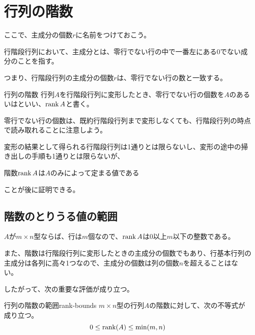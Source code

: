 \documentclass[../../../topic_linear-algebra]{subfiles}
\begin{document}
\sectionline
\section{行列の階数}

ここで、主成分の個数$r$に名前をつけておこう。

\br

行階段行列において、主成分とは、零行でない行の中で一番左にある0でない成分のことを指す。

つまり、行階段行列の主成分の個数$r$は、零行でない行の数と一致する。

\begin{definition*}{行列の階数}
  行列$A$を行階段行列に変形したとき、零行でない行の個数を$A$のあるいはといい、$\rank A$と書く。
\end{definition*}

零行でない行の個数は、既約行階段行列まで変形しなくても、行階段行列の時点で読み取れることに注意しよう。

\br

変形の結果として得られる行階段行列は1通りとは限らないし、変形の途中の掃き出しの手順も1通りとは限らないが、
\begin{emphabox}
  \begin{spacebox}
    \begin{center}
      階数$\rank A$は$A$のみによって定まる値である
    \end{center}
  \end{spacebox}
\end{emphabox}
ことが後に証明できる。

\subsection{階数のとりうる値の範囲}

$A$が$m \times n$型ならば、行は$m$個なので、$\rank A$は0以上$m$以下の整数である。

\br

また、階数は行階段行列に変形したときの主成分の個数でもあり、行基本行列の主成分は各列に高々1つなので、主成分の個数は列の個数$n$を超えることはない。

\br

したがって、次の重要な評価が成り立つ。

\begin{theorem}{行列の階数の範囲}{rank-bounds}
  $m \times n$型の行列$A$の階数に対して、次の不等式が成り立つ。
  \begin{equation*}
    0 \leq \rank(A) \leq \min(m,n)
  \end{equation*}
\end{theorem}
\end{document}
